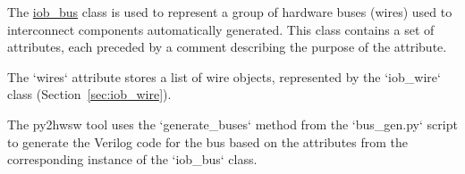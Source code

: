 %

%
%

The \href{https://github.com/IObundle/py2hwsw/blob/main/py2hwsw/scripts/iob_bus.py}{iob\_bus} class is used to represent a group of hardware buses (wires) used to interconnect components automatically generated.
This class contains a set of attributes, each preceded by a comment describing the purpose of the attribute.


The `wires` attribute stores a list of wire objects, represented by the `iob\_wire` class (Section~\ref{sec:iob_wire}).

%
%

The py2hwsw tool uses the `generate\_buses` method from the `bus\_gen.py` script to generate the Verilog code for the bus based on the attributes from the corresponding instance of the `iob\_bus` class.

